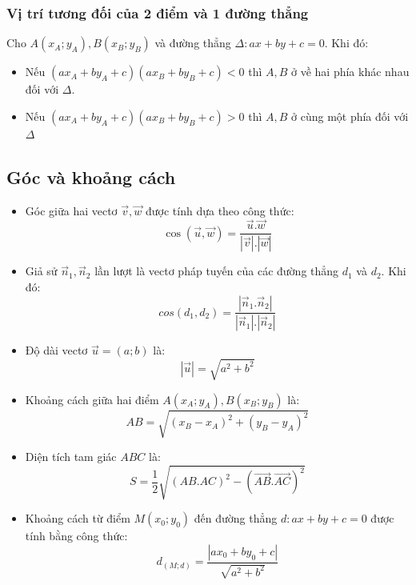 \subsubsection{Vị trí tương đối của 2 điểm và 1 đường thẳng}
Cho $A\left(x_A;y_A\right),B\left(x_B;y_B\right)$ và đường thẳng $\Delta: ax + by+ c = 0$. Khi đó:
\begin{itemize}
\item Nếu $\left(ax_A + by_A+ c \right)\left(ax_B + by_B+ c \right) <0$ thì $A,B$ ở về hai phía khác nhau đối với $\Delta$.
\item Nếu $\left(ax_A + by_A+ c \right)\left(ax_B + by_B+ c \right) >0$ thì $A,B$ ở cùng một phía đối với $\Delta$
\end{itemize}
\subsection{Góc và khoảng cách}
\begin{itemize}
\item Góc giữa hai vectơ $\vec{v}, \vec{w}$ được tính dựa theo công thức:
\begin{equation} \label{goc2vt}
\cos (\vec{u}, \vec{w}) = \dfrac{\vec{u}.\vec{w}}{\left | \vec{v} \right|.\left | \vec{w} \right| }
\end{equation}
\item Giả sử $\overrightarrow n_1,\overrightarrow n_2$ lần lượt là vectơ pháp tuyến của các đường thẳng $d_1$ và $d_2$. Khi đó:
\begin{equation} \label{goc2dt}
cos(d_1, d_2) = \dfrac{{\left| {\overrightarrow n _1 .\overrightarrow n _2 } \right|}}{{\left| {\overrightarrow n _1 } \right|.\left| {\overrightarrow n _2 } \right|}}
\end{equation}
\item Độ dài vectơ $\vec{u}=(a;b)$ là: 
\begin{equation}
\left|\vec{u}\right| = \sqrt{a^2+b^2}
\end{equation}
\item Khoảng cách giữa hai điểm $A(x_A;y_A),B(x_B;y_B)$ là:
\begin{equation}\label{ab}
AB = \sqrt{\left(x_B-x_A\right)^2+\left(y_B-y_A\right)^2}
\end{equation}
\item Diện tích tam giác $ABC$ là:
\begin{equation} \label{dttg}
S=\dfrac{1}{2}\sqrt{\left ( AB.AC \right )^2 - \left (\overrightarrow{AB}.\overrightarrow{AC}  \right )^2}
\end{equation}
\item Khoảng cách từ điểm $M(x_0; y_0)$ đến đường thẳng $d:ax+by+c=0$ được tính bằng công thức:
\begin{equation}\label{kc}
d_{(M; d)} = \dfrac{{\left| {ax_0 + by_0 + c} \right|}}{{\sqrt {a^2 + b^2 } }}
\end{equation}
\end{itemize}
